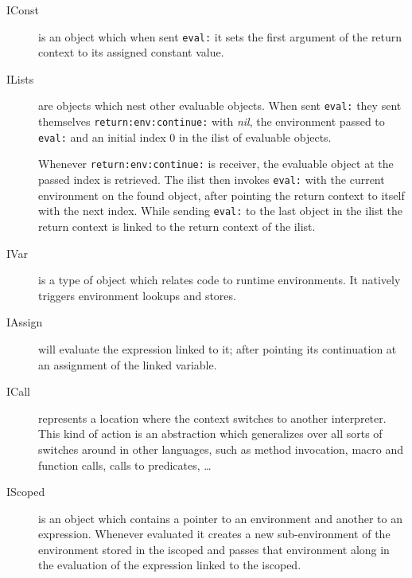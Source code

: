 \documentclass{article}
\begin{document}
\begin{description}
    \item[IConst] is an object which when sent \verb$eval:$ it sets the first argument
                  of the return context to its assigned constant value.

    \item[ILists] are objects which nest other evaluable objects. When sent \verb$eval:$
                  they sent themselves \verb$return:env:continue:$ with \emph{nil}, the
                  environment passed to \verb$eval:$ and an initial index $0$ in the ilist of
                  evaluable objects.

                  Whenever \verb$return:env:continue:$ is receiver, the evaluable object at the
                  passed index is retrieved. The ilist then invokes \verb$eval:$ with the current
                  environment on the found object, after pointing the return context to itself
                  with the next index. While sending \verb$eval:$ to the last object in the ilist
                  the return context is linked to the return context of the ilist.


    \item[IVar]   is a type of object which relates code to runtime
                  environments. It natively triggers environment lookups and
                  stores.

    \item[IAssign] will evaluate the expression linked to it; after pointing
                   its continuation at an assignment of the linked variable.

    \item[ICall]   represents a location where the context switches to
                   another interpreter. This kind of action is an abstraction
                   which generalizes over all sorts of switches around in
                   other languages, such as method invocation, macro and
                   function calls, calls to predicates, \dots 

    \item[IScoped] is an object which contains a pointer to an environment and
                   another to an expression. Whenever evaluated it creates a
                   new sub-environment of the environment stored in the
                   iscoped and passes that environment along in the evaluation
                   of the expression linked to the iscoped.
\end{description}
\end{document}
